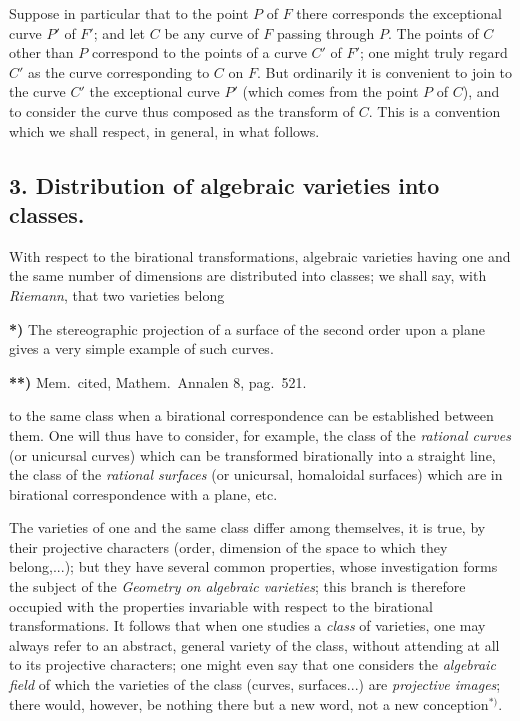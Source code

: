 \documentclass{article}
\begin{document}
Suppose in particular that to the point $P$ of $F$ there corresponds the exceptional curve $P'$ of $F'$; and let $C$ be any curve of $F$ passing through $P$. The points of $C$ other than $P$ correspond to the points of a curve $C'$ of $F'$; one might truly regard $C'$ as the curve corresponding to $C$ on $F$. But ordinarily it is convenient to join to the curve $C'$ the exceptional curve $P'$ (which comes from the point $P$ of $C$), and to consider the curve thus composed as the transform of $C$. This is a convention which we shall respect, in general, in what follows.

\subsection*{3. Distribution of algebraic varieties into classes.}

With respect to the birational transformations, algebraic varieties having one and the same number of dimensions are distributed into classes; we shall say, with \emph{Riemann}, that two varieties belong

\textbf{*)} The stereographic projection of a surface of the second order upon a plane gives a very simple example of such curves.

\textbf{**)} Mem.\ cited, Mathem.\ Annalen 8, pag.\ 521.

to the same class when a birational correspondence can be established between them. One will thus have to consider, for example, the class of the \emph{rational curves} (or unicursal curves) which can be transformed birationally into a straight line, the class of the \emph{rational surfaces} (or unicursal, homaloidal surfaces) which are in birational correspondence with a plane, etc.

The varieties of one and the same class differ among themselves, it is true, by their projective characters (order, dimension of the space to which they belong,...); but they have several common properties, whose investigation forms the subject of the \emph{Geometry on algebraic varieties}; this branch is therefore occupied with the properties invariable with respect to the birational transformations. It follows that when one studies a \emph{class} of varieties, one may always refer to an abstract, general variety of the class, without attending at all to its projective characters; one might even say that one considers the \emph{algebraic field} of which the varieties of the class (curves, surfaces...) are \emph{projective images}; there would, however, be nothing there but a new word, not a new conception${}^{*)}$.
\end{document}
